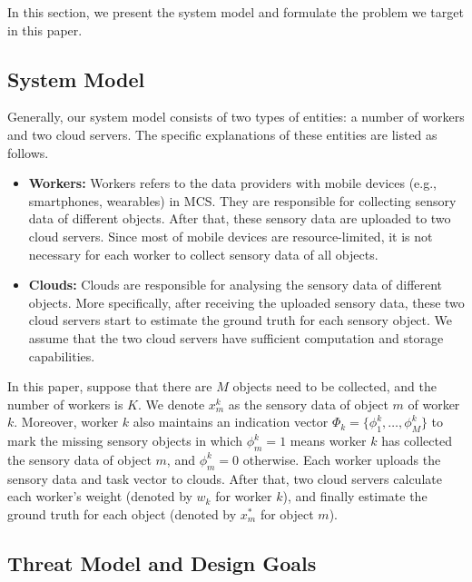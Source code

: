\documentclass[conference]{IEEEtran}
\begin{document}
In this section, we present the system model and formulate the problem we target in this paper.
\subsection{System Model}\label{sec3-A}

Generally, our system model consists of two types of entities: a number of workers and two cloud servers. %
The specific explanations of these entities are listed as follows.
\begin{itemize}
  \item \textbf{Workers:} Workers refers to the data providers with mobile devices (e.g., smartphones, wearables) in MCS. They are responsible for collecting sensory data of different objects. After that, these sensory data are uploaded to two cloud servers.  Since most of mobile devices are resource-limited, it is not necessary for each worker to collect sensory data of all objects.
  \item \textbf{Clouds:} Clouds are responsible for analysing the sensory data of different objects. More specifically, after receiving the uploaded sensory data, these two cloud servers start to estimate the ground truth for each sensory object. We assume that the two cloud servers have sufficient computation and storage capabilities.
\end{itemize}
In this paper, suppose that there are $M$ objects need to be collected, and the number of workers is $K$.
We denote $x_m^k$ as the sensory data of object $m$ of worker $k$.
Moreover, worker $k$ also maintains an indication vector $\Phi_k = \{\phi_1^k, \ldots, \phi_M^k\}$ to mark the missing sensory objects in which $\phi_m^k = 1$ means worker $k$ has collected the sensory data of object $m$, and $\phi_m^k = 0$ otherwise.
Each worker uploads the sensory data and task vector to clouds.
After that, two cloud servers calculate each worker's weight (denoted by $w_k$ for worker $k$), and finally estimate the ground truth for each object (denoted by $x_m^*$ for object $m$). 
\subsection{Threat Model and Design Goals}
\end{document}
